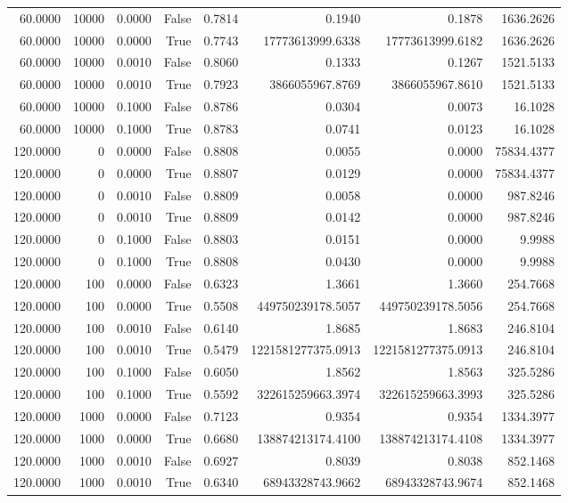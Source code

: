 \begin{table}
\begin{tabular}{rrrrrrrr}
60.0000 & 10000 & 0.0000 & False & 0.7814 & 0.1940 & 0.1878 & 1636.2626 \\
60.0000 & 10000 & 0.0000 & True & 0.7743 & 17773613999.6338 & 17773613999.6182 & 1636.2626 \\
60.0000 & 10000 & 0.0010 & False & 0.8060 & 0.1333 & 0.1267 & 1521.5133 \\
60.0000 & 10000 & 0.0010 & True & 0.7923 & 3866055967.8769 & 3866055967.8610 & 1521.5133 \\
60.0000 & 10000 & 0.1000 & False & 0.8786 & 0.0304 & 0.0073 & 16.1028 \\
60.0000 & 10000 & 0.1000 & True & 0.8783 & 0.0741 & 0.0123 & 16.1028 \\
120.0000 & 0 & 0.0000 & False & 0.8808 & 0.0055 & 0.0000 & 75834.4377 \\
120.0000 & 0 & 0.0000 & True & 0.8807 & 0.0129 & 0.0000 & 75834.4377 \\
120.0000 & 0 & 0.0010 & False & 0.8809 & 0.0058 & 0.0000 & 987.8246 \\
120.0000 & 0 & 0.0010 & True & 0.8809 & 0.0142 & 0.0000 & 987.8246 \\
120.0000 & 0 & 0.1000 & False & 0.8803 & 0.0151 & 0.0000 & 9.9988 \\
120.0000 & 0 & 0.1000 & True & 0.8808 & 0.0430 & 0.0000 & 9.9988 \\
120.0000 & 100 & 0.0000 & False & 0.6323 & 1.3661 & 1.3660 & 254.7668 \\
120.0000 & 100 & 0.0000 & True & 0.5508 & 449750239178.5057 & 449750239178.5056 & 254.7668 \\
120.0000 & 100 & 0.0010 & False & 0.6140 & 1.8685 & 1.8683 & 246.8104 \\
120.0000 & 100 & 0.0010 & True & 0.5479 & 1221581277375.0913 & 1221581277375.0913 & 246.8104 \\
120.0000 & 100 & 0.1000 & False & 0.6050 & 1.8562 & 1.8563 & 325.5286 \\
120.0000 & 100 & 0.1000 & True & 0.5592 & 322615259663.3974 & 322615259663.3993 & 325.5286 \\
120.0000 & 1000 & 0.0000 & False & 0.7123 & 0.9354 & 0.9354 & 1334.3977 \\
120.0000 & 1000 & 0.0000 & True & 0.6680 & 138874213174.4100 & 138874213174.4108 & 1334.3977 \\
120.0000 & 1000 & 0.0010 & False & 0.6927 & 0.8039 & 0.8038 & 852.1468 \\
120.0000 & 1000 & 0.0010 & True & 0.6340 & 68943328743.9662 & 68943328743.9674 & 852.1468 \\

\end{tabular}
\end{table}
